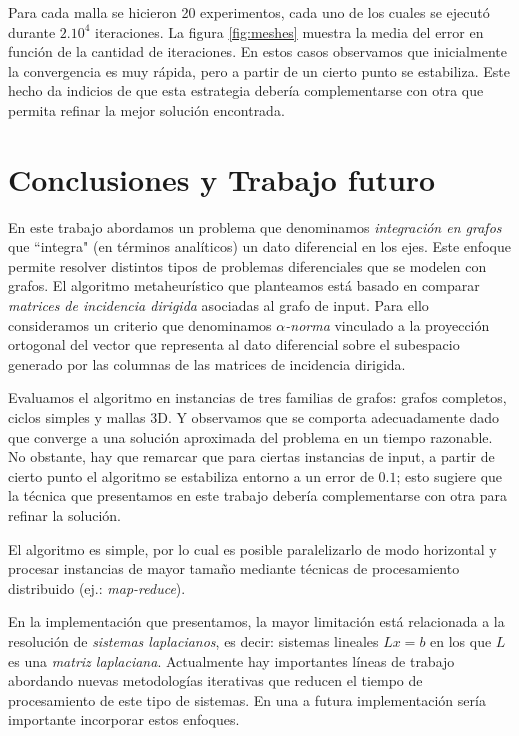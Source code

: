 \documentclass[conference,compsoc,a4paper]{IEEEtran}
\begin{document}
\smallskip

Para cada malla se hicieron 20 experimentos, cada uno de los cuales se 
ejecutó durante $2.10^4$ iteraciones. La figura \ref{fig:meshes} 
muestra la media del error en función de la cantidad de iteraciones. En 
estos casos observamos que inicialmente la convergencia es muy rápida, 
pero a partir de un cierto punto se estabiliza. Este hecho da 
indicios de que esta estrategia debería complementarse con otra que 
permita refinar la mejor solución encontrada.


\section{Conclusiones y Trabajo futuro}

En este trabajo abordamos un problema que denominamos \emph{integración 
en grafos} que ``integra" (en términos analíticos) un dato 
diferencial en los ejes. Este enfoque permite resolver distintos tipos 
de problemas diferenciales que se modelen con grafos. El algoritmo 
metaheurístico que planteamos está basado en comparar \emph{matrices 
de incidencia dirigida} asociadas al grafo de input. Para ello 
consideramos un criterio que denominamos \emph{$\alpha$-norma} vinculado 
a la proyección ortogonal del vector que representa al dato diferencial 
sobre el subespacio generado por las columnas de las matrices de 
incidencia dirigida.

\bigskip

Evaluamos el algoritmo en instancias de tres familias de grafos: grafos 
completos, ciclos simples y mallas 3D. Y observamos que se comporta 
adecuadamente dado que converge a una solución aproximada del problema 
en un tiempo razonable. No obstante, hay que remarcar que para ciertas 
instancias de input, a partir de cierto punto el algoritmo se 
estabiliza entorno a un error de $0.1$; esto sugiere que la técnica que 
presentamos en este trabajo debería complementarse con otra para 
refinar la solución.

\bigskip

El algoritmo es simple, por lo cual es posible paralelizarlo de modo 
horizontal y procesar instancias de mayor tamaño mediante técnicas 
de procesamiento distribuido (ej.: \emph{map-reduce}).

\bigskip

En la implementación que presentamos, la mayor limitación está 
relacionada a la resolución de \emph{sistemas laplacianos}, es decir: 
sistemas lineales $Lx=b$ en los que $L$ es una \emph{matriz 
laplaciana}. Actualmente hay importantes líneas de trabajo abordando 
nuevas metodologías iterativas que reducen el tiempo de 
procesamiento de este tipo de sistemas. En una a futura implementación
 sería importante incorporar estos enfoques. 
\end{document}
